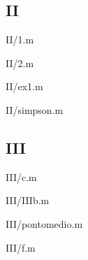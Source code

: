 \documentclass[portuguese, a4paper]{article}
\newcommand\tu[0]{\textunderscore}
\begin{document}
\subsection{II}
	\par{II/1.m}
	
	\par{II/2.m}
	
	\par{II/ex1.m}
	
	\par{II/simpson.m}
	
\subsection{III}
	\par{III/c.m}
	
	\par{III/III\tu b.m}
	
	\par{III/ponto\tu medio.m}
	
	\par{III/f.m}
	
\end{document}
